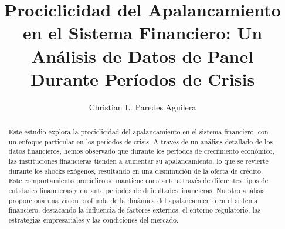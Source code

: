 \documentclass[a4paper,fleqn]{cas-sc}
\begin{document}
\let\WriteBookmarks\relax
\def\floatpagepagefraction{1}
\def\textpagefraction{.001}

\shorttitle{}    


\title[mode = title]{Prociclicidad del Apalancamiento en el Sistema Financiero: Un Análisis de Datos de Panel Durante Períodos de Crisis}  

\tnotemark[1]



\author[1]{Christian L. Paredes Aguilera}%









\begin{abstract}
    Este estudio explora la prociclicidad del apalancamiento en el sistema financiero, con un enfoque particular en los períodos de crisis. A través de un análisis detallado de los datos financieros, hemos observado que durante los períodos de crecimiento económico, las instituciones financieras tienden a aumentar su apalancamiento, lo que se revierte durante los shocks exógenos, resultando en una disminución de la oferta de crédito. Este comportamiento procíclico se mantiene constante a través de diferentes tipos de entidades financieras y durante períodos de dificultades financieras. Nuestro análisis proporciona una visión profunda de la dinámica del apalancamiento en el sistema financiero, destacando la influencia de factores externos, el entorno regulatorio, las estrategias empresariales y las condiciones del mercado.
\end{abstract}
\end{document}
